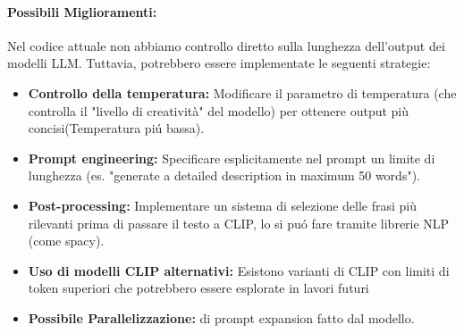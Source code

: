 \documentclass{article}
\begin{document}
\paragraph{Possibili Miglioramenti:}
Nel codice attuale non abbiamo controllo diretto sulla lunghezza dell'output dei modelli LLM. Tuttavia, potrebbero essere implementate le seguenti strategie:
\begin{itemize}
    \item \textbf{Controllo della temperatura:} Modificare il parametro di temperatura (che controlla il "livello di creatività" del modello) per ottenere output più concisi(Temperatura piú bassa). 
    \item \textbf{Prompt engineering:} Specificare esplicitamente nel prompt un limite di lunghezza (es. "generate a detailed description in maximum 50 words").
    \item \textbf{Post-processing:} Implementare un sistema di selezione delle frasi più rilevanti prima di passare il testo a CLIP, lo si puó fare tramite librerie NLP (come spacy).
    \item \textbf{Uso di modelli CLIP alternativi:} Esistono varianti di CLIP con limiti di token superiori che potrebbero essere esplorate in lavori futuri
    \item \textbf{Possibile Parallelizzazione:} di prompt expansion fatto dal modello.
\end{itemize}
\end{document}
